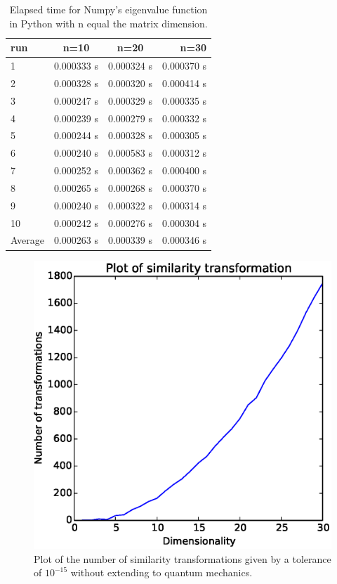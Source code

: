 \documentclass{article}
\begin{document}
\begin{table}[H]
    \centering
    \begin{tabular}{|l|c|c|r|}
    \hline
     run & n=10 & n=20 & n=30 \\
     \hline
      1  & 0.000333 s & 0.000324 s & 0.000370 s\\
      2  & 0.000328 s & 0.000320 s & 0.000414 s\\
      3  & 0.000247 s & 0.000329 s & 0.000335 s\\
      4  & 0.000239 s & 0.000279 s & 0.000332 s\\
      5  & 0.000244 s & 0.000328 s & 0.000305 s\\
      6  & 0.000240 s & 0.000583 s & 0.000312 s\\
      7  & 0.000252 s & 0.000362 s & 0.000400 s\\
      8  & 0.000265 s & 0.000268 s & 0.000370 s\\
      9  & 0.000240 s & 0.000322 s & 0.000314 s\\
      10 & 0.000242 s & 0.000276 s & 0.000304 s\\
      \hline
      Average & 0.000263 s & 0.000339 s & 0.000346 s\\
      \hline
    \end{tabular}
    \caption{Elapsed time for Numpy's eigenvalue function in Python with n equal the matrix dimension.}
    \label{timeusednumpy}
\end{table}



\begin{figure}
  \includegraphics{simtransformations.eps}
  \caption{Plot of the number of similarity transformations given by a tolerance of $10^{-15}$ without extending to quantum mechanics.}
  \label{simtrans}
\end{figure}
\end{document}
